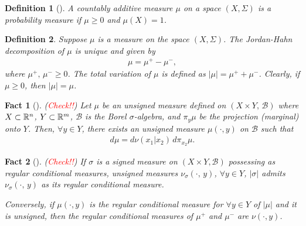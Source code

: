 \documentclass[dvipsnames]{article}
\newtheorem{fact}{Fact}
\newtheorem{definition}{Definition}
\providecommand{\R}{\ensuremath \mathbb{R}}
\begin{document}
\centering{\rule{.5\columnwidth}{1pt}}
\begin{definition}[{\cite[Definition 1.3.4]{bogachev_v1}}]
  A countably additive measure $\mu$ on a space $(X,\Sigma)$ is a probability measure if $\mu\ge 0$ and $\mu(X)=1$.
\end{definition}
\begin{definition}
  Suppose $\mu$ is a measure on the space $(X,\Sigma)$. The Jordan-Hahn decomposition of $\mu$ is unique and given by
  \begin{align*}
    \mu=\mu^+-\mu^-,
  \end{align*}
  where $\mu^+,\,\mu^-\ge 0$. The total variation of $\mu$ is defined as $|\mu|=\mu^++\mu^-$. Clearly, if $\mu\ge 0$, then $|\mu|=\mu$.
\end{definition}
\begin{fact}[{\cite[Theorem 10.4.14]{bogachev_v2}}](\textcolor{red}{Check!!})
  Let $\mu$ be an unsigned measure defined on $(X\times Y,\,\mathcal B)$ where $X\subset \R^n$, $Y\subset \R^m$, $\mathcal B$ is the Borel $\sigma$-algebra, and $\pi_{y}\mu$ be the projection (marginal) onto $Y$. Then, $\forall y\in Y$, there exists an unsigned measure $\mu(\cdot,y)$ on $\mathcal B$ such that
  \begin{align*}
    d\mu=d\nu(x_1|x_2)\,d\pi_{x_2}\mu.
  \end{align*}
\label{fact:unsigned_conditional}
\end{fact}
\begin{fact}[{\cite[Remark 10.4.4]{bogachev_v2}}](\textcolor{red}{Check!!})
  If $\sigma$ is a signed measure on $(X\times Y, \mathcal B)$ possessing as regular conditional measures, unsigned measures $\nu_\sigma(\cdot,\,y)$, $\forall y\in Y$, $|\sigma|$ admits $\nu_\sigma(\cdot,\,y)$ as its regular conditional measure.
  \par
  Conversely, if $\mu(\cdot,y)$ is the regular conditional measure for $\forall y\in Y$ of $|\mu|$ and it is unsigned, then the regular conditional measures of $\mu^+$ and $\mu^-$ are $\nu(\cdot,y)$.
\label{fact:variation}
\end{fact}
\end{document}

